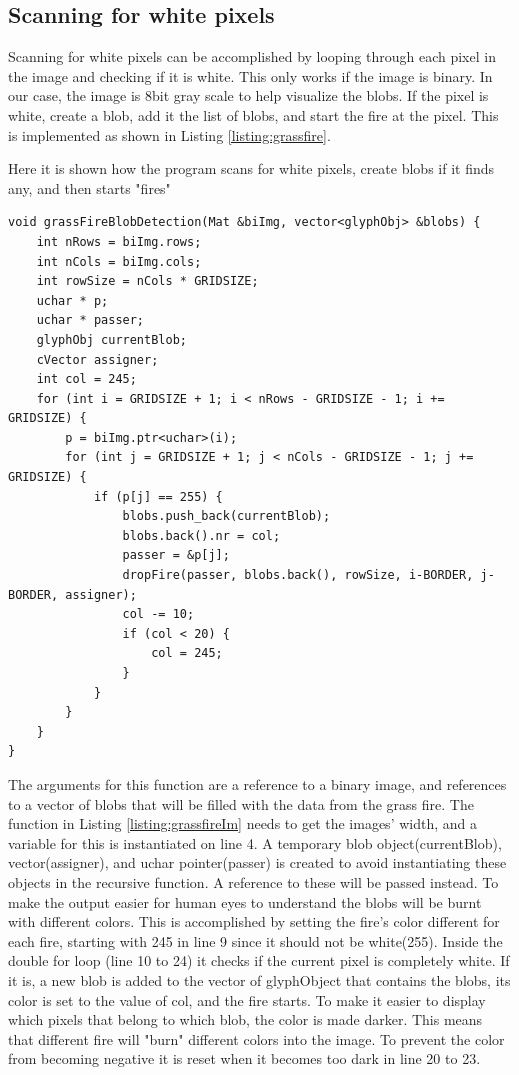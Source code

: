 \subsection{Scanning for white pixels}
Scanning for white pixels can be accomplished by looping through each pixel in the image and checking if it is white. This only works if the image is binary. In our case, the image is 8bit gray scale to help visualize the blobs. If the pixel is white, create a blob, add it the list of blobs, and start the fire at the pixel. This is implemented as shown in Listing \autoref{listing:grassfire}.
\begin{listing}[H]
	\caption{Here it is shown how the program scans for white pixels, create blobs if it finds any, and then starts "fires"}
	\begin{verbatim}
void grassFireBlobDetection(Mat &biImg, vector<glyphObj> &blobs) {
	int nRows = biImg.rows;
	int nCols = biImg.cols;
	int rowSize = nCols * GRIDSIZE;
	uchar * p;
	uchar * passer;
	glyphObj currentBlob;
	cVector assigner;
	int col = 245;
	for (int i = GRIDSIZE + 1; i < nRows - GRIDSIZE - 1; i += GRIDSIZE) {
		p = biImg.ptr<uchar>(i);
		for (int j = GRIDSIZE + 1; j < nCols - GRIDSIZE - 1; j += GRIDSIZE) {
			if (p[j] == 255) {
				blobs.push_back(currentBlob);
				blobs.back().nr = col;
				passer = &p[j];
				dropFire(passer, blobs.back(), rowSize, i-BORDER, j-BORDER, assigner);
				col -= 10;
				if (col < 20) {
					col = 245;
				}
			}
		}
	}
}
	\end{verbatim}
	\label{listing:grassfire}
\end{listing}
The arguments for this function are a reference to a binary image, and references to a vector of blobs that will be filled with the data from the grass fire. The  function in Listing \ref{listing:grassfireIm} needs to get the images' width, and a variable for this is instantiated on line 4. A temporary blob object(currentBlob), vector(assigner), and uchar pointer(passer) is created to avoid instantiating these objects in the recursive function. A reference to these will be passed instead. To make the output easier for human eyes to understand the blobs will be burnt with different colors. This is accomplished by setting the fire's color different for each fire, starting with 245 in line 9 since it should not be white(255). Inside the double for loop (line 10 to 24) it checks if the current pixel is completely white. If it is, a new blob is added to the vector of glyphObject that contains the blobs, its color is set to the value of col, and the fire starts. To make it easier to display which pixels that belong to which blob, the color is made darker. This means that different fire will "burn" different colors into the image. To prevent the color from becoming negative it is reset when it becomes too dark in line 20 to 23.\\
